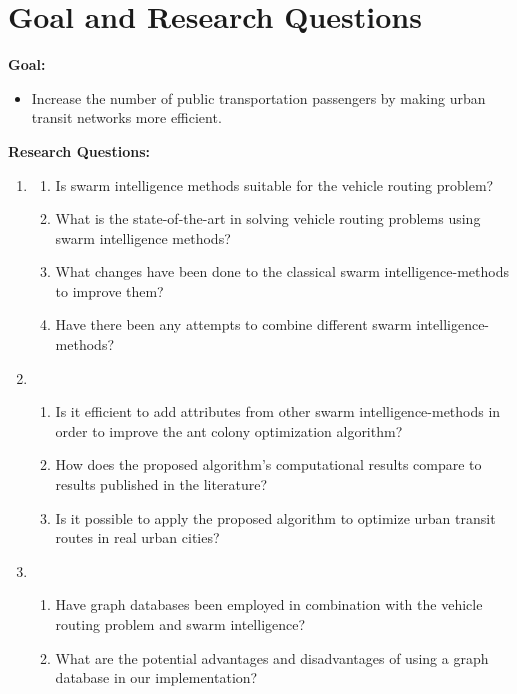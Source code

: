 \section{Goal and Research Questions}
\textbf{Goal:}
\begin{itemize}
\item \label{itm:goal} Increase the number of public transportation passengers by making urban transit networks more efficient.
\end{itemize}
\textbf{Research Questions:}
\begin{enumerate}[label=\textbf{\arabic*})]
\item \label{itm:1}
    \begin{enumerate}
    \item \label{itm:1a} Is swarm intelligence methods suitable for the vehicle routing problem?
    \item \label{itm:1b} What is the state-of-the-art in solving vehicle routing problems using swarm intelligence methods?
    \item \label{itm:1c} What changes have been done to the classical swarm intelligence-methods to improve them?
    \item \label{itm:1d} Have there been any attempts to combine different swarm intelligence-methods?
	\end{enumerate}
\item
    \begin{enumerate}
    \item \label{itm:2a} Is it efficient to add attributes from other swarm intelligence-methods in order to improve the ant colony optimization algorithm?
    \item \label{itm:2b1} How does the proposed algorithm's computational results compare to results published in the literature?
    \item \label{itm:2c} Is it possible to apply the proposed algorithm to optimize urban transit routes in real urban cities?
    \end{enumerate}
\item
	\begin{enumerate}
    \item \label{itm:3b} Have graph databases been employed in combination with the vehicle routing problem and swarm intelligence?
	\item \label{itm:3a} What are the potential advantages and disadvantages of using a graph database in our implementation?
    \end{enumerate}
\end{enumerate}